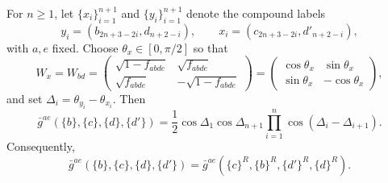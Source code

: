 \begin{lemma*}[\ref{lemma:summed-history-reversal}]
For $n\geq1$, let $\{x_i\}_{i=1}^{n+1}$ and $\{y_i\}_{i=1}^{n+1}$ denote
the compound labels
\begin{equation}
    y_i=(b_{2n+3-2i},d_{n+2-i}),\qquad x_i=(c_{2n+3-2i},d'_{n+2-i}),
\end{equation}
with $a,e$ fixed.  Choose $\theta_x\in[0,\pi/2]$ so that
\begin{equation}
    W_x=W_{bd}=\begin{pmatrix}
                \sqrt{1 - f_{abde}} & \sqrt{f_{abde}}\\
       \sqrt{f_{abde}} & -\sqrt{1 - f_{abde}}
    \end{pmatrix}= \begin{pmatrix}\cos\theta_x&\sin\theta_x\\
    \sin\theta_x&-\cos\theta_x\end{pmatrix},
\end{equation}
and set $\Delta_i=\theta_{y_i}-\theta_{x_i}$.  Then
\begin{equation}
    \bar g^{ae}(\{b\},\{c\},\{d\},\{d'\})
    =\frac12\cos\Delta_1\cos\Delta_{n+1}
      \prod_{i=1}^{n}\cos(\Delta_i-\Delta_{i+1}).
\end{equation}
Consequently,
\begin{equation}
    \bar g^{ae}(\{b\},\{c\},\{d\},\{d'\})
    =\bar g^{ae}(\{c\}^R,\{b\}^R,\{d'\}^R,\{d\}^R).
    \label{eq:PRR}
\end{equation}
\end{lemma*}
